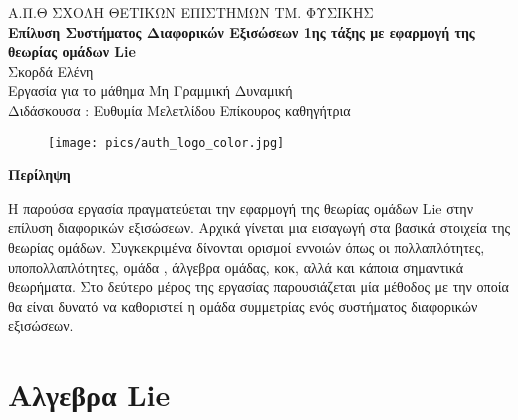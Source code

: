 \documentclass[12pt]{article}
\renewenvironment{abstract}[1][1.0]
{
	\begin{center}
		{\bf Περίληψη}\\[12pt]
		\begin{minipage}{#1\textwidth}
}
{
		\end{minipage}
	\end{center}
}
\begin{document}
	\begin{titlepage}
		\begin{center}
		\large{{\sc Α.Π.Θ} ΣΧΟΛΗ ΘΕΤΙΚΩΝ ΕΠΙΣΤΗΜΩΝ ΤΜ. ΦΥΣΙΚΗΣ}\\[0.5cm]
		\vspace{1cm}
		\LARGE\textbf{Επίλυση Συστήματος Διαφορικών Εξισώσεων 1ης τάξης με εφαρμογή της θεωρίας ομάδων \textlatin{Lie} }\\[1.0cm] 
		
		\large{Σκορδά Ελένη}\\[0.2cm]
		
		\vspace{1cm}
		\small{Εργασία για το μάθημα Μη Γραμμική Δυναμική}\\[0.1cm] 
		\small{Διδάσκουσα : Ευθυμία Μελετλίδου Επίκουρος καθηγήτρια }\\[0.2cm]
		
		\begin{figure}[H]\centering
		\texttt{[image: pics/auth\_logo\_color.jpg]}
		\end{figure}
		\end{center}
		
		\begin{abstract}
		         Η παρούσα εργασία πραγματεύεται την εφαρμογή της θεωρίας ομάδων \textlatin{Lie} στην επίλυση διαφορικών εξισώσεων. Αρχικά γίνεται μια εισαγωγή στα βασικά στοιχεία της θεωρίας ομάδων. Συγκεκριμένα δίνονται ορισμοί εννοιών όπως οι πολλαπλότητες, υποπολλαπλότητες, ομάδα , άλγεβρα ομάδας, κοκ, αλλά και κάποια σημαντικά θεωρήματα. Στο δεύτερο μέρος της εργασίας παρουσιάζεται μία μέθοδος με την οποία θα είναι δυνατό να καθοριστεί η ομάδα συμμετρίας ενός συστήματος διαφορικών εξισώσεων. 
		\end{abstract}
		\vfill
		
	\end{titlepage}
	
	\newpage
	\tableofcontents
	\newpage
	
	
	
	
	\nocite{topologysame}
	\nocite{coordinateCharts}
	\nocite{manifold}
	\nocite{olver2000applications}	
	\section{Αλγεβρα \textlatin{Lie} }
	
	\newpage
	
	
\end{document}
